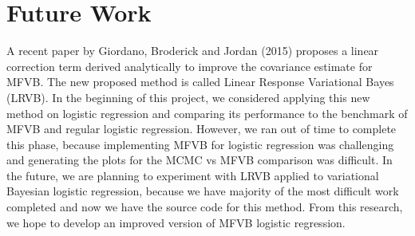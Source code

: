 
\section{Future Work}\label{sec:future}

A recent paper by Giordano, Broderick and Jordan (2015) proposes a linear correction term derived analytically to improve the covariance estimate for MFVB.  The new proposed method is called Linear Response Variational Bayes (LRVB).  In the beginning of this project, we considered applying this new method on logistic regression and comparing its performance to the benchmark of MFVB and regular logistic regression.  However, we ran out of time to complete this phase, because implementing MFVB for logistic regression was challenging and generating the plots for the MCMC vs MFVB comparison was difficult.  In the future, we are planning to experiment with LRVB applied to variational Bayesian logistic regression, because we have majority of the most difficult work completed and now we have the source code for this method.  From this research, we hope to develop an improved version of MFVB logistic regression.  